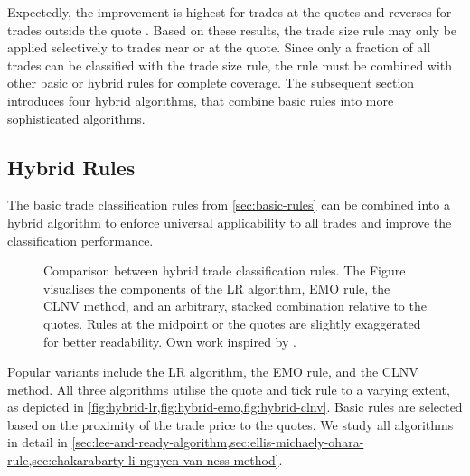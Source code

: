 Expectedly, the improvement is highest for trades at the quotes and reverses for trades outside the quote \autocite[][15]{grauerOptionTradeClassification2022}. Based on these results, the trade size rule may only be applied selectively to trades near or at the quote. Since only a fraction of all trades can be classified with the trade size rule, the rule must be combined with other basic or hybrid rules for complete coverage. The subsequent section introduces four hybrid algorithms, that combine basic rules into more sophisticated algorithms.

\subsection{Hybrid Rules}\label{sec:hybrid-rules}

The basic trade classification rules from \cref{sec:basic-rules} can be combined into a hybrid algorithm to enforce universal applicability to all trades and improve the classification performance.

\begin{figure}[ht!]
    \hfill
    \hfill\null
    \caption[Comparison Between Hybrid Trade Classification Rules]{Comparison between hybrid trade classification rules. The Figure visualises the components of the \acrshort{LR} algorithm, \acrshort{EMO} rule, the \acrshort{CLNV} method, and an arbitrary, stacked combination relative to the quotes. Rules at the midpoint or the quotes are slightly exaggerated for better readability. Own work inspired by \textcite[][167]{poppeSensitivityVPINChoice2016}.}
    \label{fig:hybrid-algorithms}
\end{figure}

Popular variants include the \gls{LR} algorithm, the \gls{EMO} rule, and the \gls{CLNV} method. All three algorithms utilise the quote and tick rule to a varying extent, as depicted in \cref{fig:hybrid-lr,fig:hybrid-emo,fig:hybrid-clnv}. Basic rules are selected based on the proximity of the trade price to the quotes. We study all algorithms in detail in \cref{sec:lee-and-ready-algorithm,sec:ellis-michaely-ohara-rule,sec:chakarabarty-li-nguyen-van-ness-method}.


